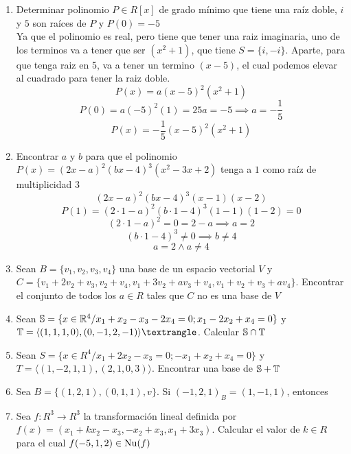 \documentclass[../practica.root.tex]{subfiles}
\begin{document}
\begin{enumerate}
    \item Determinar polinomio $P \in R[x]$ de grado mínimo que tiene una raíz doble, $i$ y $5$ son raíces de $P$ y $P(0) = -5$ \\
          Ya que el polinomio es real, pero tiene que tener una raiz imaginaria, uno de los terminos va a tener que ser $(x^2 + 1)$, que tiene $S = \{i, -i\}$. Aparte, para que tenga raiz en 5, va a tener un termino $(x-5)$, el cual podemos elevar al cuadrado para tener la raiz doble.
          \[ P(x) = a(x-5)^2(x^2+1) \]
          \[ P(0) = a(-5)^2(1) = 25a = -5 \implies a = -\frac{1}{5} \]
          \[ P(x) = -\frac{1}{5}(x-5)^2(x^2+1) \]

    \item Encontrar $a$ y $b$ para que el polinomio $P(x) = (2x-a)^2(bx-4)^3(x^2-3x+2)$ tenga a $1$ como raíz de multiplicidad $3$ %
          \[ (2x - a)^2 (bx - 4)^3 (x - 1)(x - 2) \]
          \[ P(1) = (2\cdot 1 - a)^2 (b\cdot 1 - 4)^3 (1 - 1)(1 - 2) = 0 \]
          \[ (2\cdot 1 - a)^2 = 0 = 2 - a \implies a = 2 \]
          \[ (b\cdot 1 - 4)^3 \neq 0 \implies b \neq 4 \]
          \[ \boxed{a = 2 \land a \neq 4} \]

    \item Sean $B = \{v_1, v_2, v_3, v_4\}$ una base de un espacio vectorial $V$ y $C = \{v_1 + 2v_2 + v_3,v_2 + v_4,v_1 + 3v_2 + av_3 + v_4,v_1 + v_2 + v_3 + av_4\}$. Encontrar el conjunto de todos los $a \in R$ tales que $C$ no es una base de $V$ %

    \item Sean $\mathbb{S} = \{x \in \mathbb{R}^4 / x_1 + x_2 - x_3 - 2x_4 = 0; x_1 - 2x_2 + x_4 = 0\}$ y $\T = \langle(1,1,1,0),(0,-1,2,-1)\rangle⟩$. Calcular $\mathbb{S} \cap \mathbb{T}$ %

    \item Sean $S = \{x \in R^4 / x_1 + 2x_2 - x_3 = 0; -x_1 + x_2 + x_4 = 0\}$ y $T = \langle(1,-2,1,1),(2,1,0,3)\rangle$. Encontrar una base de $\mathbb{S} + \mathbb{T}$ %

    \item Sea $B = \{(1,2,1),(0,1,1),v\}$. Si $(-1,2,1)_B = (1,-1,1)$, entonces

    \item Sea $f : R^3 \to R^3$ la transformación lineal definida por $f(x) = (x_1 + kx_2 - x_3, -x_2 + x_3, x_1 + 3x_3)$. Calcular el valor de $k \in R$ para el cual $f(-5,1,2) \in \operatorname{Nu}(f)$


\end{enumerate}
\end{document}
